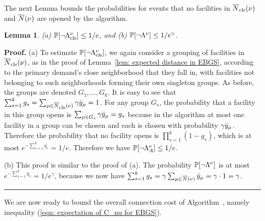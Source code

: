 \documentclass[oneside,final]{ucr}
\newtheorem{lemma}[theorem]{Lemma}
\newenvironment{proof}[1][Proof]{\textbf{#1.} }{\ \rule{0.5em}{0.5em}}
\begin{document}
The next Lemma bounds the probabilities for events
that no facilities in ${\overline{N}}_{{\mbox{\scriptsize\rm cls}}}(\nu)$ and ${\overline{N}}(\nu)$ are
opened by the algorithm.


\begin{lemma}\label{lem: close and far neighbor probability}
{\rm (a)} $\mathbb{P}[\neg\Lambda^\nu_{{\mbox{\scriptsize\rm cls}}}] \le 1/e$, and
{\rm (b)} $\mathbb{P}[\neg\Lambda^\nu] \le 1/e^\gamma$.
\end{lemma}
\begin{proof}
  (a) To estimate $\mathbb{P}[\neg\Lambda^\nu_{{\mbox{\scriptsize\rm cls}}}]$, we again consider a
  grouping of facilities in ${\overline{N}}_{{\mbox{\scriptsize\rm cls}}}(\nu)$, as in the proof of
  Lemma~\ref{lem: expected distance in EBGS}, according to the primary
  demand's close neighborhood that they fall in, with facilities not
  belonging to such neighborhoods forming their own singleton groups.
  As before, the groups are denoted $G_1, \ldots, G_k$. It is easy to
  see that $\sum_{s=1}^k g_s = \sum_{\mu \in {\overline{N}}_{{\mbox{\scriptsize\rm cls}}}(\nu)} \gamma
  {\bar y}_{\mu} = 1$. For any group $G_s$, the probability that a
  facility in this group opens is $\sum_{\mu \in G_s} \gamma
  {\bar y}_{\mu} = g_s$ because in the algorithm at most one facility in
  a group can be chosen and each is chosen with probability $\gamma
  {\bar y}_{\mu}$. Therefore the probability that no facility 
  opens is $\prod_{s=1}^k (1 - g_s)$, which is
  at most $e^{-\sum_{s=1}^k g_s} = 1/e$. Therefore we have
  $\mathbb{P}[\neg\Lambda^\nu_A] \leq 1/e$.

(b)
  This proof is similar to the proof of (a). The probability $\mathbb{P}[\neg\Lambda^\nu]$ is at most
  $e^{-\sum_{s=1}^k g_s} = 1/e^\gamma$, because we now have
  $\sum_{s=1}^k g_s = \gamma \sum_{\mu \in {\overline{N}}(\nu)} {\bar y}_{\mu} =
  \gamma \cdot 1 = \gamma$.
\end{proof}


We are now ready to bound the overall connection cost of
Algorithm~{\EBGS}, namely inequality (\ref{eqn: expectation of C_nu for EBGS}).

\end{document}
